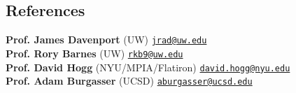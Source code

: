 \documentclass[margin,line]{resume}
\newcommand{\tab}[1]{\hspace{.2667\textwidth}\rlap{#1}}
\newcommand{\itab}[1]{\hspace{0em}\rlap{#1}}
\begin{document}
\begin{resume}


\section{\mysidestyle \textcolor{bcolor}{References}}
\textbf{Prof. James Davenport} (UW) \hfill {\tt \href{jrad@uw.edu}{jrad@uw.edu}} \\
\textbf{Prof. Rory Barnes} (UW) \hfill {\tt \href{rkb9@uw.edu}{rkb9@uw.edu}} \\
\textbf{Prof. David Hogg} (NYU/MPIA/Flatiron) \hfill {\tt \href{david.hogg@nyu.edu}{david.hogg@nyu.edu}}  \\
\textbf{Prof. Adam Burgasser} (UCSD) \hfill {\tt \href{aburgasser@ucsd.edu}{aburgasser@ucsd.edu}}   \\



\end{resume}
\end{document}
